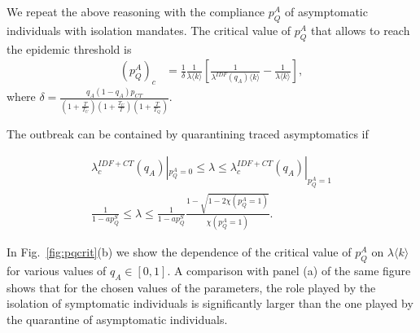 \documentclass[aps,twocolumn,superscriptaddress,nofootinbib,pre,floatfix]{revtex4-1}
\begin{document}
We repeat the above reasoning with the compliance $p_Q^A$ of
asymptomatic individuals with isolation mandates.  The critical value
of $p_Q^A$ that allows to reach the epidemic threshold is
\begin{align}
        (p_Q^A)_c &= \frac{1}{\delta}\frac{1}{\lambda \langle k
    \rangle} \left[ \frac{1}{\lambda^{IDF}(q_A) \langle k \rangle} -
    \frac{1}{\lambda \langle k \rangle} \right],
\end{align}
where
$\delta = \frac{q_A(1-q_A) p_{CT}}{(1+\frac{T}{T_U})(1+\frac{T_U}{T})(1+\frac{T}{T_Q})}$.

The outbreak can be contained by quarantining traced asymptomatics if

\begin{align}
    \lambda_c^{IDF+CT}(q_A)|_{p_Q^A=0} \leq \lambda \leq \lambda_c^{IDF+CT}(q_A)|_{p_Q^A=1}\\
    \frac{1}{1-a p_Q^S} \leq \lambda \leq \frac{1}{1-a p_Q^S} \frac{1-\sqrt{1-2 \chi(p_Q^A=1)}}{\chi(p_Q^A=1)}.
    \label{eq:conditions}
\end{align}


In Fig.~\ref{fig:pqcrit}(b) we show the dependence of the critical value
of $p_Q^A$ on $\lambda \langle k \rangle$ for various values of $q_A
\in [0,1]$. A comparison with panel (a) of the same figure shows that
for the chosen values of the parameters, the
role played by the isolation of symptomatic individuals is
significantly larger than the one played by the quarantine of
asymptomatic individuals.


\end{document}

